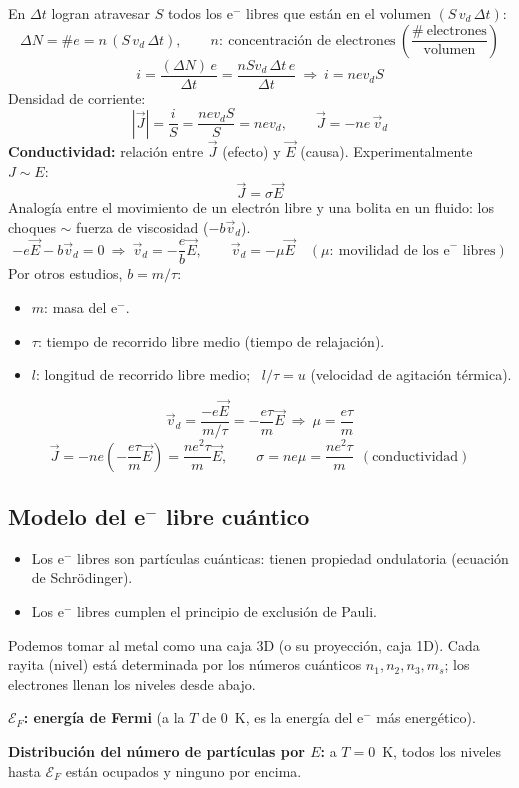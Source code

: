 \documentclass[11pt,a4paper]{article}
\newcommand{\Ep}{\mathcal{E}}
\begin{document}
En $\Delta t$ logran atravesar $S$ todos los e$^-$ libres que están en el volumen $(S\,v_d\,\Delta t)$:
\[
\Delta N=\#e=n\,(S\,v_d\,\Delta t),\qquad n:\ \text{concentración de electrones}\ \left(\frac{\#\ \text{electrones}}{\text{volumen}}\right)
\]
\[
i=\frac{(\Delta N)\,e}{\Delta t}=\frac{nSv_d\,\Delta t\,e}{\Delta t}\ \Rightarrow\ \boxed{i=nev_dS}
\]
Densidad de corriente:
\[
|\vec J|=\frac iS=\frac{nev_dS}{S}=nev_d,\qquad \vec J=-ne\,\vec v_d
\]
\textbf{Conductividad:} relación entre $\vec J$ (efecto) y $\vec E$ (causa). Experimentalmente $J\sim E$:
\[
\vec J=\sigma\vec E
\]
Analogía entre el movimiento de un electrón libre y una bolita en un fluido: los choques $\sim$ fuerza de viscosidad ($-b\vec v_d$).
\[
-e\vec E-b\vec v_d=0\ \Rightarrow\ \vec v_d=-\frac eb\vec E,\qquad \vec v_d=-\mu\vec E\quad(\mu:\ \text{movilidad de los e}^-\text{ libres})
\]
Por otros estudios, $b=m/\tau$:
\begin{itemize}
  \item $m$: masa del e$^-$.
  \item $\tau$: tiempo de recorrido libre medio (tiempo de relajación).
  \item $l$: longitud de recorrido libre medio; \ $l/\tau=u$ (velocidad de agitación térmica).
\end{itemize}
\[
\vec v_d=\frac{-e\vec E}{m/\tau}=-\frac{e\tau}{m}\vec E\ \Rightarrow\ \mu=\frac{e\tau}{m}
\]
\[
\vec J=-ne\left(-\frac{e\tau}{m}\vec E\right)=\frac{ne^2\tau}{m}\vec E,\qquad
\boxed{\sigma=ne\mu=\frac{ne^2\tau}{m}}\ \ (\text{conductividad})
\]

\subsection{Modelo del e$^-$ libre cuántico}
\begin{itemize}
  \item Los e$^-$ libres son partículas cuánticas: tienen propiedad ondulatoria (ecuación de Schrödinger).
  \item Los e$^-$ libres cumplen el principio de exclusión de Pauli.
\end{itemize}
Podemos tomar al metal como una caja 3D (o su proyección, caja 1D). Cada rayita (nivel) está determinada por los números
cuánticos $n_1,n_2,n_3,m_s$; los electrones llenan los niveles desde abajo.

\textbf{$\Ep_F$: energía de Fermi} (a la $T$ de 0~K, es la energía del e$^-$ más energético).

\textbf{Distribución del número de partículas por $E$:} a $T=0$~K, todos los niveles hasta $\Ep_F$ están ocupados y ninguno por encima.
\end{document}
